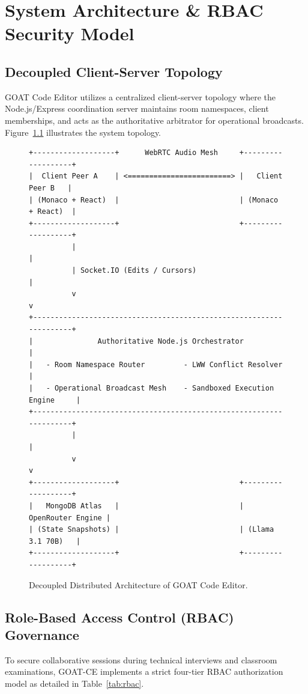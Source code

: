 \documentclass[12pt,a4paper]{report}
\begin{document}
\chapter{System Architecture \& RBAC Security Model}

\section{Decoupled Client-Server Topology}
GOAT Code Editor utilizes a centralized client-server topology where the Node.js/Express coordination server maintains room namespaces, client memberships, and acts as the authoritative arbitrator for operational broadcasts. Figure~\ref{fig:arch} illustrates the system topology.

\begin{figure}[htbp]
\centering
\begin{verbatim}
+-------------------+      WebRTC Audio Mesh     +-------------------+
|  Client Peer A    | <========================> |   Client Peer B   |
| (Monaco + React)  |                            | (Monaco + React)  |
+-------------------+                            +-------------------+
          |                                                |
          | Socket.IO (Edits / Cursors)                    |
          v                                                v
+--------------------------------------------------------------------+
|               Authoritative Node.js Orchestrator                   |
|   - Room Namespace Router         - LWW Conflict Resolver          |
|   - Operational Broadcast Mesh    - Sandboxed Execution Engine     |
+--------------------------------------------------------------------+
          |                                                |
          v                                                v
+-------------------+                            +-------------------+
|   MongoDB Atlas   |                            | OpenRouter Engine |
| (State Snapshots) |                            | (Llama 3.1 70B)   |
+-------------------+                            +-------------------+
\end{verbatim}
\caption{Decoupled Distributed Architecture of GOAT Code Editor.}
\label{fig:arch}
\end{figure}

\section{Role-Based Access Control (RBAC) Governance}
To secure collaborative sessions during technical interviews and classroom examinations, GOAT-CE implements a strict four-tier RBAC authorization model as detailed in Table~\ref{tab:rbac}.
\end{document}
